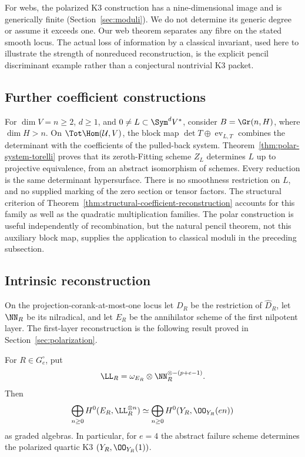 For webs, the polarized K3 construction has a nine-dimensional image
and is generically finite (Section~\ref{sec:moduli}).  We do not
determine its generic degree or assume it exceeds one.  Our web
theorem separates any fibre on the stated smooth locus.  The actual
loss of information by a classical invariant, used here to illustrate
the strength of nonreduced reconstruction, is the explicit pencil
discriminant example rather than a conjectural nontrivial K3 packet.

\subsection{Further coefficient constructions}

For \(\dim V=n\ge2\), \(d\ge1\), and
\(0\ne L\subset\Sym^dV^*\), consider \(B=\Gr(n,H)\),
where \(\dim H>n\).  On \(\Tot\Hom(\mathcal U,V)\), the
block map \(\det T\oplus\operatorname{ev}_{L,T}\) combines
the determinant with the coefficients of the pulled-back system.
Theorem~\ref{thm:polar-system-torelli} proves that its zeroth-Fitting
scheme \(Z_L\) determines \(L\) up to projective equivalence,
from an abstract isomorphism of schemes.  Every reduction is the same
determinant hypersurface.  There is no smoothness restriction on
\(L\), and no supplied marking of the zero section or tensor factors.
The structural criterion of
Theorem~\ref{thm:structural-coefficient-reconstruction} accounts for
this family as well as the quadratic multiplication families.
The polar construction is useful independently of recombination, but
the natural pencil theorem, not this auxiliary block map, supplies
the application to classical moduli in the preceding subsection.

\subsection{Intrinsic reconstruction}

On the projection-corank-at-most-one locus let \(D_R\) be the
restriction of \(\widehat D_R\), let \(\NN_R\) be its
nilradical, and let \(E_R\) be the annihilator scheme of the first
nilpotent layer.  The first-layer reconstruction is the following result
proved in Section~\ref{sec:polarization}.

\begin{theorem}
\label{thm:main-reconstruction}
For \(R\in G_e^\circ\), put
\[
 \LL_R=\omega_{E_R}\otimes
 \NN_R^{\otimes-(p+e-1)}.
\]
Then
\[
 \bigoplus_{n\ge0}H^0(E_R,\LL_R^{\otimes n})
 \simeq
 \bigoplus_{n\ge0}H^0(Y_R,\OO_{Y_R}(en))
\]
as graded algebras.  In particular, for \(e=4\) the abstract
failure scheme determines the polarized quartic K3
\((Y_R,\OO_{Y_R}(1))\).
\end{theorem}


